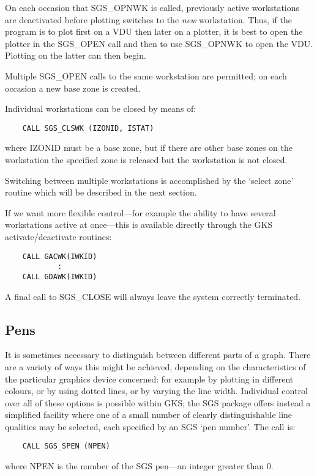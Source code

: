 On each occasion that SGS\_OPNWK is called, previously
active workstations are deactivated before plotting switches
to the {\em new} workstation.  Thus, if the program is to plot
first on a VDU then later on a plotter, it is best to open the
plotter in the SGS\_OPEN call and then to use SGS\_OPNWK to open
the VDU.  Plotting on the latter can then begin.

Multiple SGS\_OPEN calls to the same workstation are permitted;  on
each occasion a new base zone is created.

Individual workstations can be closed by means of:
\begin{verbatim}
    CALL SGS_CLSWK (IZONID, ISTAT)
\end{verbatim}
where IZONID must be a base zone, but if there are other base zones on the
workstation the specified zone is released but the workstation is not closed.

Switching between multiple workstations is accomplished by the `select
zone' routine which will be described in the next section.

If we want more flexible control---for example the ability to have several
workstations active at once---this is available
directly through the GKS activate/deactivate routines:
\begin{verbatim}
    CALL GACWK(IWKID)
            :
    CALL GDAWK(IWKID)
\end{verbatim}
A final call to SGS\_CLOSE will always leave the system correctly
terminated.  

\subsection {Pens}

It is sometimes necessary to distinguish between different parts
of a graph.  There are a variety
of ways this might be achieved, depending
on the characteristics of the particular graphics device
concerned: for example
by plotting in different
colours, or by using dotted lines, or by varying the
line width.  Individual control over all of
these options is possible within GKS;  the
SGS package offers instead a simplified facility
where one of a small
number of clearly distinguishable line qualities may
be selected, each specified by an SGS `pen number'.  The call is:
\begin{verbatim}
    CALL SGS_SPEN (NPEN)
\end{verbatim}
where NPEN is the number of the SGS pen---an integer greater than 0.

